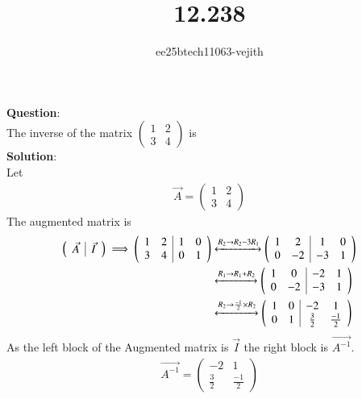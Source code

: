 \documentclass[journal]{IEEEtran}
\begin{document}

\vspace{3cm}

\title{12.238}
\author{ee25btech11063-vejith}

\maketitle
{\let\newpage\relax\maketitle}
\renewcommand{\thefigure}{\theenumi}
\renewcommand{\thetable}{\theenumi}
\setlength{\intextsep}{10pt} %
\textbf{Question}:\\
The inverse of the matrix
$\begin{pmatrix}
    1 & 2\\
    3 & 4
\end{pmatrix}$ is \hspace{12cm} \\
\textbf{Solution}:\\
Let 
\begin{align}
    \Vec{A}=\begin{pmatrix}
    1 & 2\\
    3 & 4
\end{pmatrix}
\end{align}
The augmented matrix is 
\begin{align}
    \left(\begin{array}{c|c}
        \Vec{A} & \Vec{I}
\end{array}\right)
\implies 
\left(\begin{array}{cc|cc}
        1 & 2 & 1 & 0\\
        3 & 4 &  0 & 1
\end{array}\right)  &\xleftrightarrow{R_2 \rightarrow R_2-3R_1} \left(\begin{array}{cc|cc}
        1 & 2 & 1 & 0\\
        0 & -2 &  -3 & 1
\end{array}\right)\\
&\xleftrightarrow{R_1 \rightarrow R_1 + R_2} \left(\begin{array}{cc|cc}
        1 & 0 & -2 & 1\\
        0 & -2 &  -3 & 1
\end{array}\right)\\
&\xleftrightarrow{R_2 \rightarrow \frac{-1}{2} \times R_2} \left(\begin{array}{cc|cc}
        1 & 0 & -2 & 1\\
        0 & 1 &  \frac{3}{2} & \frac{-1}{2}
\end{array}\right)
\end{align}
As the left block of the Augmented matrix is $\Vec{I}$ the right block is $\Vec{A^{-1}}$.
\begin{align}
    \Vec{A^{-1}}=\begin{pmatrix}
    -2 & 1\\
    \frac{3}{2} & \frac{-1}{2}
\end{pmatrix}
\end{align}
\end{document}
